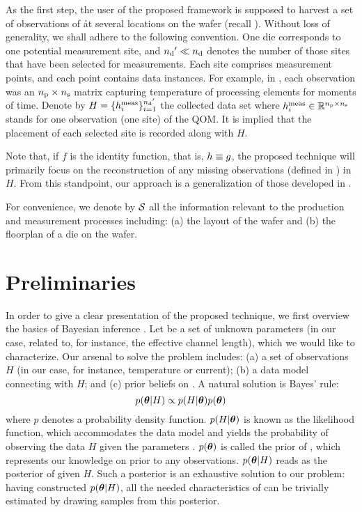 As the first step, the user of the proposed framework is supposed to harvest a
set of observations of \h at several locations on the wafer (recall
). Without loss of generality, we shall adhere to the following
convention. One die corresponds to one potential measurement site, and ${n_\mathrm{d}}' \ll
{n_\mathrm{d}}$ denotes the number of those sites that have been selected for measurements.
Each site comprises \np measurement points, and each point contains \ns data
instances. For example, in , each observation was an ${n_\mathrm{p}}
\times {n_\mathrm{s}}$ matrix capturing temperature of \np processing elements for \ns
moments of time. Denote by $H = \{ h_i^{\mathrm{meas}} \}_{i = 1}^{{n_\mathrm{d}}'}$ the
collected data set where $h_i^{\mathrm{meas}} \in \mathbb{R}^{{n_\mathrm{p}} \times {n_\mathrm{s}}}$ stands for
one observation (one site) of the \ac{QOM}. It is implied that the placement of
each selected site is recorded along with $H$.

Note that, if $f$ is the identity function, that is, $h \equiv g$, the
proposed technique will primarily focus on the reconstruction of any missing
observations (defined in ) in $H$. From this
standpoint, our approach is a generalization of those developed in
\cite{zhang2010, reda2009}.

For convenience, we denote by $\mathcal{S}$ all the information relevant to the
production and measurement processes including: (a) the layout of the wafer and
(b) the floorplan of a die on the wafer.

\section{Preliminaries}

In order to give a clear presentation of the proposed technique, we first
overview the basics of Bayesian inference \cite{gelman2004}. Let \vt be a set of
unknown parameters (in our case, related to, for instance, the effective channel
length), which we would like to characterize. Our arsenal to solve the problem
includes: (a) a set of observations $H$ (in our case, for instance, temperature
or current); (b) a data model connecting \vt with $H$; and (c) prior beliefs on
\vt. A natural solution is Bayes' rule:
\begin{equation} \elab{bayes-theorem}
  p(\vt | H) \propto p(H | \vt) p(\vt)
\end{equation}
where $p$ denotes a probability density function. $p(H | \boldsymbol{\theta})$ is known as the
likelihood function, which accommodates the data model and yields the
probability of observing the data $H$ given the parameters \vt. $p(\boldsymbol{\theta})$ is
called the prior of \vt, which represents our knowledge on \vt prior to any
observations. $p(\boldsymbol{\theta} | H)$ reads as the posterior of \vt given $H$. Such a
posterior is an exhaustive solution to our problem: having constructed $p(\boldsymbol{\theta} |
H)$, all the needed characteristics of \vt can be trivially estimated by drawing
samples from this posterior.

